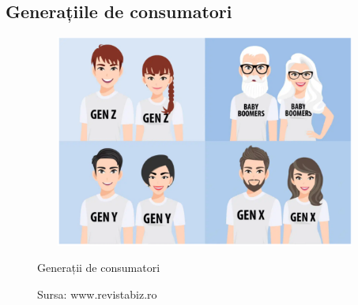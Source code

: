 \documentclass[a4paper, 12pt]{article}
\begin{document}
		\subsection{Generațiile de consumatori}
			\begin{figure}[!htb]
			\centering
			\includegraphics[width=13cm,height=7cm]{"figures/generatii.png"}
			\caption{Generații de consumatori}
			\caption*{Sursa: www.revistabiz.ro}
		\end{figure}
		
\end{document}
